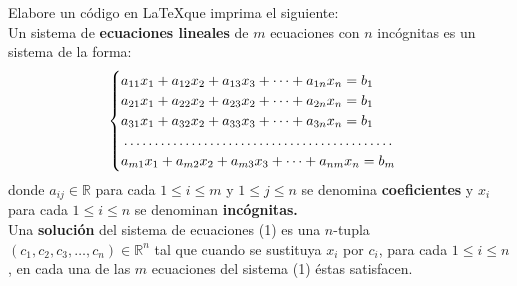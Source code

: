 \documentclass[12pt]{book}
\begin{document}
    Elabore un código en \LaTeX que imprima el siguiente:
    \\ 
    Un sistema de \textbf{ecuaciones lineales} de $m$ ecuaciones con $n$ incógnitas es 
    un sistema de la forma: \\ 
    \begin{equation}
        \begin{cases}
            a_{11}x_{1}+a_{12}x_{2}+a_{13}x_{3}+\cdots+a_{1n}x_{n} = b_{1} \\ 
            a_{21}x_{1}+a_{22}x_{2}+a_{23}x_{2}+\cdots+a_{2n}x_{n} = b_{1} \\ 
            a_{31}x_{1}+a_{32}x_{2}+a_{33}x_{3}+\cdots+a_{3n}x_{n} = b_{1} \\ 
            \dotfill \\ 
            a_{m1}x_{1}+a_{m2}x_{2}+a_{m3}x_{3}+ \cdots + a_{nm}x_{n} = b_{m}
        \end{cases}
    \end{equation}
    donde $a_{ij} \in \mathbb{R}$ para cada $1 \leq i \leq m$ y $1 \leq j \leq n$ se denomina 
    \textbf{coeficientes} y $x_{i}$ para cada $1 \leq i \leq n$ se denominan \textbf{incógnitas.} \\ 
    
    Una \textbf{solución} del sistema de ecuaciones (1) es una $n$-tupla $(c_{1},c_{2},c_{3},\dots,c_{n}) \in \mathbb{R}^{n}$ tal que cuando 
    se sustituya $x_{i}$ por $c_{i}$, para cada $1 \leq i \leq n$, en cada una de las $m$ ecuaciones del sistema (1) éstas satisfacen. \\ 
    
\end{document}

